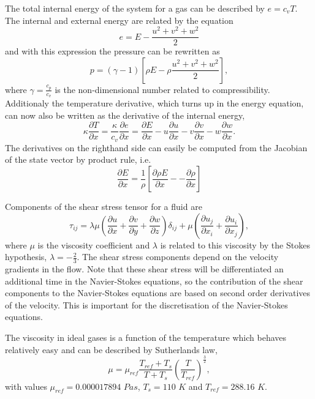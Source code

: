 \documentclass{report}
\newcommand{\dx}[1]{\frac{\partial #1}{\partial x}}
\newcommand{\dy}[1]{\frac{\partial #1}{\partial y}}
\newcommand{\dz}[1]{\frac{\partial #1}{\partial z}}
\begin{document}
The total internal energy of the system for a gas can be described by $e = c_vT$. The internal and external energy are related by the equation
\begin{equation}
\label{e:internalEnergy}
e = E - \frac{u^2 + v^2 + w^2}{2}
\end{equation}
and with this expression the pressure can be rewritten as
\begin{equation}
\label{e:idealGasLaw2}
p = (\gamma - 1)\left[ \rho E - \rho \frac{u^2 + v^2 + w^2}{2} \right],
\end{equation}
where $\gamma = \frac{c_p}{c_v}$ is the non-dimensional number related to compressibility. Additionaly the temperature derivative, which turns up in the energy equation, can now also be written as the derivative of the internal energy,
\begin{equation}
\label{e:temperature}
\kappa\dx{T} =  \frac{\kappa}{c_v}\dx{e} = \dx{E} - u\dx{u} - v\dx{v} -w\dx{w}.
\end{equation}
The derivatives on the righthand side can easily be computed from the Jacobian of the state vector by product rule, i.e.
\begin{equation}
\label{e:partialStatederivative}
\dx{E} = \frac{1}{\rho} \left[ \dx{\rho E} -- \dx{\rho} \right]
\end{equation}

Components of the shear stress tensor for a fluid are
\begin{equation}
\label{e:shearStressTensor}
\tau_{ij} = 
\lambda \mu \left (
\dx{u} + \dy{v} + \dz{w}
\right)
\delta_{ij}
+
\mu \left( 
\frac{\partial u_j}{\partial x_i} + \frac{\partial u_i}{\partial x_j}
\right),
\end{equation}
where $\mu$ is the viscosity coefficient and $\lambda$ is related to this viscosity by the Stokes hypothesis, $\lambda = - \frac{2}{3}$. The shear stress components depend on the velocity gradients in the flow. Note that these shear stress will be differentiated an additional time in the Navier-Stokes equations, so the contribution of the shear components to the Navier-Stokes equations are based on second order derivatives of the velocity. This is important for the discretisation of the Navier-Stokes equations.

The viscosity in ideal gases is a function of the temperature which behaves relatively easy and can be described by Sutherlands law,
\begin{equation}
\label{e:SutherlandsLaw}
\mu = \mu_{ref}  \frac{T_{ref} + T_s}{T + T_s} \left( \frac{T}{T_{ref}} \right)^\frac{3}{2},
\end{equation}
with values $\mu_{ref} = 0.000017894$ $Pa s$, $T_s = 110$ $K$ and $T_{ref} = 288.16$ $K$.
\end{document}

